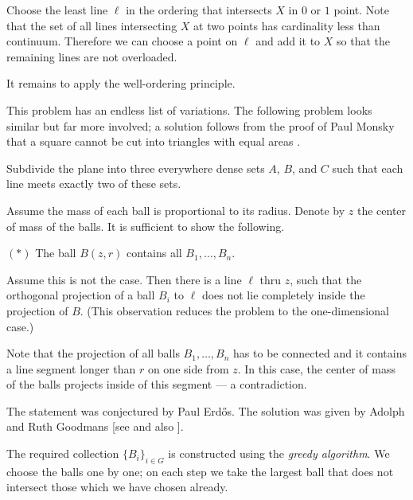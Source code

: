 Choose the least line $\ell$ in the ordering that intersects $X$ 
in $0$ or $1$ point.
Note that the set of all lines intersecting $X$ at two points has cardinality less than continuum.
Therefore we can choose a point on $\ell$ and add it to $X$ so that the remaining lines are not overloaded.

It remains to apply the well-ordering principle.
\qeds

This problem has an endless list of variations.
The following problem looks similar but far more involved;
a solution follows from the proof of Paul Monsky that a square cannot be cut into triangles with equal areas \cite{monsky}.

\begin{pr}
Subdivide the plane into three everywhere dense sets $A$, $B$, and $C$ such that each line meets exactly two of these sets.
\end{pr}


Assume the mass of each ball is proportional to its radius.
Denote by $z$  the center of mass of the balls.
It is sufficient to show the following.
\begin{cl}{$({*})$}
The ball $B(z,r)$ contains all $B_1,\dots,B_n$.
\end{cl}

Assume this is not the case.
Then there is a line $\ell$ thru $z$, 
such that the orthogonal projection of a ball $B_i$ to $\ell$ 
does not lie completely inside the projection of $B$.
(This observation reduces the problem to the one-dimensional case.)

Note that the projection of all balls $B_1,\dots,B_n$ has to be connected and it contains a line segment longer than $r$ on one side from $z$. 
In this case, the center of mass of the balls projects inside of this segment --- a contradiction.
\qeds

The statement was conjectured by Paul Erdős.
The solution was given by Adolph and Ruth Goodmans
[see  and also ].


The required collection $\{B_i\}_{i\in G}$ is constructed using the \emph{greedy algorithm}. 
We choose the balls one by one;
on each step we take the largest ball that does not intersect those which we have chosen already.

\medskip


